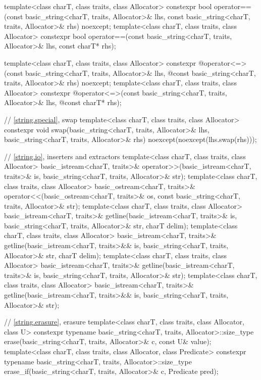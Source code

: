 \begin{codeblock}
{  template<class charT, class traits, class Allocator>
    constexpr bool
      operator==(const basic_string<charT, traits, Allocator>& lhs,
                 const basic_string<charT, traits, Allocator>& rhs) noexcept;
  template<class charT, class traits, class Allocator>
    constexpr bool operator==(const basic_string<charT, traits, Allocator>& lhs,
                              const charT* rhs);

  template<class charT, class traits, class Allocator>
    constexpr @\seebelow@ operator<=>(const basic_string<charT, traits, Allocator>& lhs,
              @\itcorr@                      const basic_string<charT, traits, Allocator>& rhs) noexcept;
  template<class charT, class traits, class Allocator>
    constexpr @\seebelow@ operator<=>(const basic_string<charT, traits, Allocator>& lhs,
              @\itcorr@                      const charT* rhs);

  // \ref{string.special}, swap
  template<class charT, class traits, class Allocator>
    constexpr void
      swap(basic_string<charT, traits, Allocator>& lhs,
           basic_string<charT, traits, Allocator>& rhs)
        noexcept(noexcept(lhs.swap(rhs)));

  // \ref{string.io}, inserters and extractors
  template<class charT, class traits, class Allocator>
    basic_istream<charT, traits>&
      operator>>(basic_istream<charT, traits>& is,
                 basic_string<charT, traits, Allocator>& str);
  template<class charT, class traits, class Allocator>
    basic_ostream<charT, traits>&
      operator<<(basic_ostream<charT, traits>& os,
                 const basic_string<charT, traits, Allocator>& str);
  template<class charT, class traits, class Allocator>
    basic_istream<charT, traits>&
      getline(basic_istream<charT, traits>& is,
              basic_string<charT, traits, Allocator>& str,
              charT delim);
  template<class charT, class traits, class Allocator>
    basic_istream<charT, traits>&
      getline(basic_istream<charT, traits>&& is,
              basic_string<charT, traits, Allocator>& str,
              charT delim);
  template<class charT, class traits, class Allocator>
    basic_istream<charT, traits>&
      getline(basic_istream<charT, traits>& is,
              basic_string<charT, traits, Allocator>& str);
  template<class charT, class traits, class Allocator>
    basic_istream<charT, traits>&
      getline(basic_istream<charT, traits>&& is,
              basic_string<charT, traits, Allocator>& str);

  // \ref{string.erasure}, erasure
  template<class charT, class traits, class Allocator, class U>
    constexpr typename basic_string<charT, traits, Allocator>::size_type
      erase(basic_string<charT, traits, Allocator>& c, const U& value);
  template<class charT, class traits, class Allocator, class Predicate>
    constexpr typename basic_string<charT, traits, Allocator>::size_type
      erase_if(basic_string<charT, traits, Allocator>& c, Predicate pred);

}
\end{codeblock}
